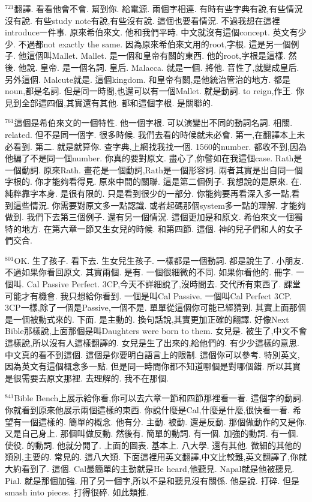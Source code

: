 \documentclass{book}
\begin{document}
$^{721}$翻譯.
看看他會不會.
幫到你.
給電源.
兩個字相連.
有時有些字典有說,有些情況沒有說.
有些study note有說,有些沒有說.
這個也要看情況.
不過我想在這裡introduce一件事.
原來希伯來文.
他和我們平時.
中文就沒有這個concept.
英文有少少.
不過都not exactly the same.
因為原來希伯來文用的root,字根.
這是另一個例子.
他這個叫Mallet.
Mallet.
是一個和皇帝有關的東西.
他的root,字根是這樣.
然後.
他說.
皇帝.
是一個名詞.
皇后.
Malacca.
就是一個.
將他.
音性了,就變成皇后.
另外這個.
Malcute就是.
這個kingdom.
和皇帝有關,是他統治管治的地方.
都是noun,都是名詞.
但是同一時間,也還可以有一個Mallet.
就是動詞.
to reign,作王.
你見到全部這四個,其實還有其他.
都和這個字根.
是關聯的.

$^{761}$這個是希伯來文的一個特性.
他一個字根.
可以演變出不同的動詞名詞.
相關.
related.
但不是同一個字.
很多時候.
我們去看的時候就未必會.
第一,在翻譯本上未必看到.
第二.
就是就算你.
查字典,上網找我找一個.
1560的number.
都收不到,因為他編了不是同一個number.
你真的要對原文.
盡心了,你譬如在我這個case.
Rath是一個動詞.
原來Rath.
畫花是一個動詞,Rath是一個形容詞.
兩者其實是出自同一個字根的.
你才能夠看得見.
原來中間的關聯.
這是第二個例子.
我想說的是原來.
在.
純粹靠字本身.
是很有限的.
只是看到很少的一部分.
你能夠要再看深入多一點,看到這些情況.
你需要對原文多一點認識.
或者起碼那個system多一點的理解.
才能夠做到.
我們下去第三個例子.
還有另一個情況.
這個更加是和原文.
希伯來文一個獨特的地方.
在第六章一節又生女兒的時候.
和第四節.
這個.
神的兒子們和人的女子們交合.

$^{801}$OK.
生了孩子.
看下去.
生女兒生孩子.
一樣都是一個動詞.
都是說生了.
小朋友.
不過如果你看回原文.
其實兩個.
是有.
一個很細微的不同.
如果你看他的.
冊字.
一個叫.
Cal Passive Perfect.
3CP,今天不詳細說了,沒時間去.
交代所有東西了.
課堂可能才有機會.
我只想給你看到.
一個是叫Cal Passive.
一個叫Cal Perfect 3CP.
3CP一樣,除了一個是Passive,一個不是.
單單從這個你可能已經猜到.
其實上面那個是一個被動式來的.
下面.
是主動的.
換句話說,其實更加正確的翻譯.
好像Next Bible那樣說,上面那個是叫Daughters were born to them.
女兒是.
被生了,中文不會這樣說,所以沒有人這樣翻譯的.
女兒是生了出來的,給他們的.
有少少這樣的意思.
中文真的看不到這個.
這個是你要明白語言上的限制.
這個你可以參考.
特別英文,因為英文有這個概念多一點.
但是同一時間你都不知道哪個是對哪個錯.
所以其實是很需要去原文那裡.
去理解的.
我不在那個.

$^{841}$Bible Bench上展示給你看,你可以去六章一節和四節那裡看一看.
這個字的動詞.
你就看到原來他展示兩個這樣的東西.
你說什麼是Cal,什麼是什麼,很快看一看.
希望有一個這樣的.
簡單的概念.
他有分.
主動.
被動.
還是反動.
那個做動作的又是你.
又是自己身上.
那個叫做反動.
然後有.
簡單的動詞.
有一個.
加強的動詞.
有一個.
使役.
的動詞.
他就分開了.
上面的圖表.
基本上.
八大學.
還有其他.
微細的其他的類別,主要的.
常見的.
這八大類.
下面這裡用英文翻譯,中文比較難,英文翻譯了,你就大約看到了.
這個.
Cal最簡單的主動就是He heard,他聽見.
Napal就是他被聽見.
Pial.
就是那個加強.
用了另一個字,所以不是和聽見沒有關係.
他是說.
打碎.
但是smash into pieces.
打得很碎.
如此類推.
\end{document}
